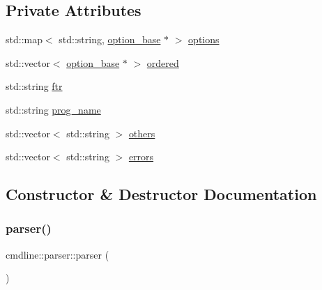 \subsection*{Private Attributes}
\begin{DoxyCompactItemize}
\item 
std\+::map$<$ std\+::string, \mbox{\hyperlink{classcmdline_1_1parser_1_1option__base}{option\+\_\+base}} $\ast$ $>$ \mbox{\hyperlink{classcmdline_1_1parser_a5c7b543914ca37b3a0a8a0973afc2aef}{options}}
\item 
std\+::vector$<$ \mbox{\hyperlink{classcmdline_1_1parser_1_1option__base}{option\+\_\+base}} $\ast$ $>$ \mbox{\hyperlink{classcmdline_1_1parser_a2015c68c25960694a43feafaca6bd147}{ordered}}
\item 
std\+::string \mbox{\hyperlink{classcmdline_1_1parser_a260075b8d293161c7357f50b7cf71e88}{ftr}}
\item 
std\+::string \mbox{\hyperlink{classcmdline_1_1parser_aacbd60921933dfc5606d22dbe1e30625}{prog\+\_\+name}}
\item 
std\+::vector$<$ std\+::string $>$ \mbox{\hyperlink{classcmdline_1_1parser_aee5711cafc2f46c238fadf593e08e599}{others}}
\item 
std\+::vector$<$ std\+::string $>$ \mbox{\hyperlink{classcmdline_1_1parser_a2818ba785f310ba0f88359d1ba9833cc}{errors}}
\end{DoxyCompactItemize}


\subsection{Constructor \& Destructor Documentation}
\mbox{\label{classcmdline_1_1parser_a436c7cba6efd596729d18d58f1016cad}} 
\subsubsection{\texorpdfstring{parser()}{parser()}}
{\footnotesize\ttfamily cmdline\+::parser\+::parser (\begin{DoxyParamCaption}{ }\end{DoxyParamCaption})\hspace{0.3cm}{\ttfamily [inline]}}

\mbox{\label{classcmdline_1_1parser_ad656d8b9b4a38ce85cd2b630c4fc9a6d}} 
